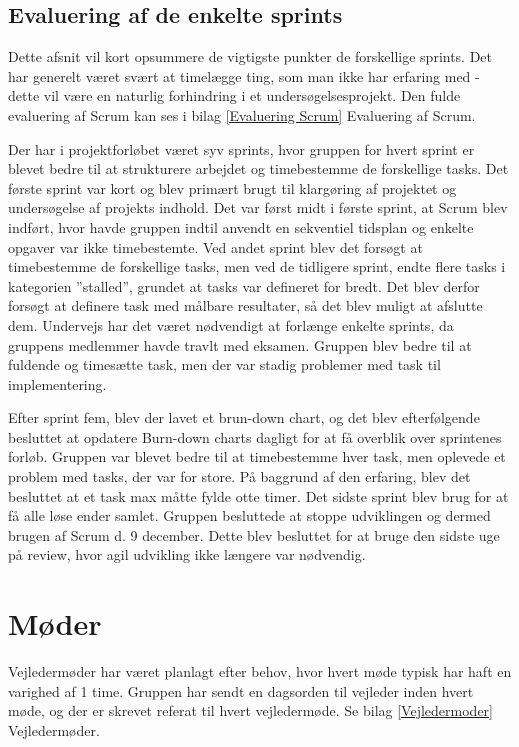 \subsection{Evaluering af de enkelte sprints} 
Dette afsnit vil kort opsummere de vigtigste punkter de forskellige sprints. Det har generelt været svært at timelægge ting, som man ikke har erfaring med - dette vil være en naturlig forhindring i et undersøgelsesprojekt. Den fulde evaluering af Scrum kan ses i bilag \ref{Evaluering Scrum} Evaluering af Scrum.

Der har i projektforløbet været syv sprints, hvor gruppen for hvert sprint er blevet bedre til at strukturere arbejdet og timebestemme de forskellige tasks. Det første sprint var kort og blev primært brugt til klargøring af projektet og undersøgelse af projekts indhold. Det var først midt i første sprint, at Scrum blev indført, hvor havde gruppen indtil anvendt en sekventiel tidsplan og enkelte opgaver var ikke timebestemte. Ved andet sprint blev det forsøgt at timebestemme de forskellige tasks, men ved de tidligere sprint, endte flere tasks i kategorien ”stalled”, grundet at tasks var defineret for bredt. Det blev derfor forsøgt at definere task med målbare resultater, så det blev muligt at afslutte dem. Undervejs har det været nødvendigt at forlænge enkelte sprints, da gruppens medlemmer havde travlt med eksamen. Gruppen blev bedre til at fuldende og timesætte task, men der var stadig problemer med task til implementering. 

Efter sprint fem, blev der lavet et brun-down chart, og det blev efterfølgende besluttet at opdatere Burn-down charts dagligt for at få overblik over sprintenes forløb. Gruppen var blevet bedre til at timebestemme hver task, men oplevede et problem med tasks, der var for store. På baggrund af den erfaring, blev det besluttet at et task max måtte fylde otte timer. Det sidste sprint blev brug for at få alle løse ender samlet. Gruppen besluttede at stoppe udviklingen og dermed brugen af Scrum d. 9 december. Dette blev besluttet for at bruge den sidste uge på review, hvor agil udvikling ikke længere var nødvendig. 
 
\section{Møder}
Vejledermøder har været planlagt efter behov, hvor hvert møde typisk har haft en varighed af 1 time. Gruppen har sendt en dagsorden til vejleder inden hvert møde, og der er skrevet referat til hvert vejledermøde. Se bilag \ref{Vejledermoder} Vejledermøder.
 
